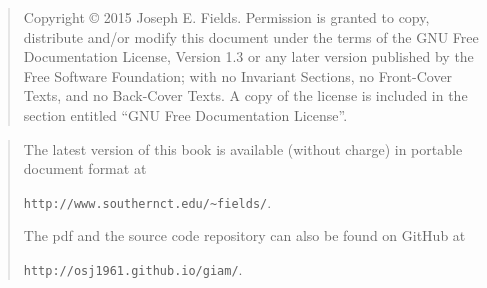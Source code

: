 \rule{0pt}{0pt}

\vfill

\begin{quote}
    Copyright \copyright{}  2015  Joseph E. Fields.
    Permission is granted to copy, distribute and/or modify this document
    under the terms of the GNU Free Documentation License, Version 1.3
    or any later version published by the Free Software Foundation;
    with no Invariant Sections, no Front-Cover Texts, and no Back-Cover Texts.
    A copy of the license is included in the section entitled ``GNU
    Free Documentation License''.
\end{quote}

\vfill

\begin{quote}
The latest version of this book is available (without charge) in portable document format at \newline
\rule{0pt}{0pt} \hspace{1in} \verb+http://www.southernct.edu/~fields/+.  

\noindent The pdf and the source code repository can also be found on GitHub at \newline
\rule{0pt}{0pt} \hspace{1in} \verb+http://osj1961.github.io/giam/+.  


\end{quote}

\vfill
